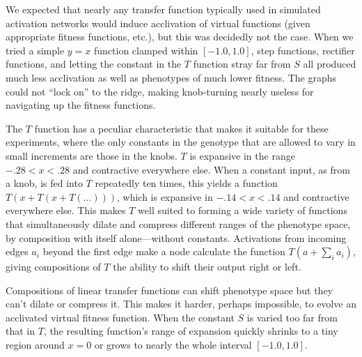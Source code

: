 \documentclass[letterpaper]{article}
\begin{document}
We expected that nearly any transfer function typically used in simulated
activation networks would induce acclivation of virtual functions (given
appropriate fitness functions, etc.), but this was decidedly not the case.
When we tried a simple $y=x$ function clamped within $[-1.0, 1.0]$, step
functions, rectifier functions, and letting the constant in the $T$ function
stray far from $S$ all produced much less acclivation as well as phenotypes of
much lower fitness.  The graphs could not ``lock on'' to the ridge, making
knob-turning nearly useless for navigating up the fitness functions.

The $T$ function has a peculiar characteristic that makes it suitable for
these experiments, where the only constants in the genotype that are allowed to
vary in small increments are those in the knobs. $T$ is expansive in the range
$-.28 < x < .28$ and contractive everywhere else. When a constant input, as
from a knob, is fed into $T$ repeatedly ten times, this yields a function
$T(x+T(x+T(\ldots)))$, which is expansive in $-.14 < x < .14$ and contractive
everywhere else. This makes $T$ well suited to forming a wide variety of
functions that simultaneously dilate and compress different ranges of the
phenotype space, by composition with itself alone---without constants.
Activations from incoming edges $a_{i}$ beyond the first edge make a node
calculate the function $T(a + \sum_i a_i)$, giving compositions of $T$ the
ability to shift their output right or left.


Compositions of linear transfer functions can shift phenotype space but they
can't dilate or compress it. This makes it harder, perhaps impossible, to
evolve an acclivated virtual fitness function. When the constant $S$ is varied
too far from that in $T$, the resulting function's range of expansion quickly
shrinks to a tiny region around $x=0$ or grows to nearly the whole interval
$[-1.0, 1.0]$.

\end{document}
